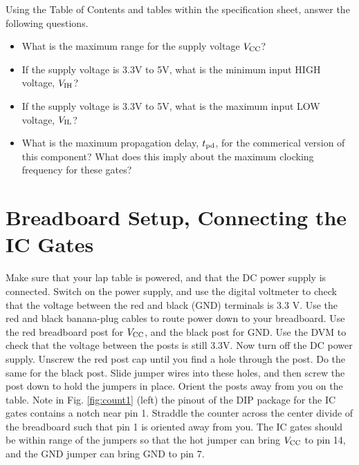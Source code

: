 \documentclass{article}
\begin{document}
\noindent
Using the Table of Contents and tables within the specification sheet, answer the following questions.
\begin{itemize}
\item What is the maximum range for the supply voltage $V_{\rm CC}$? \vspace{0.25cm}
\item If the supply voltage is 3.3V to 5V, what is the minimum input HIGH voltage, $V_{\rm IH}$? \vspace{0.25cm}
\item If the supply voltage is 3.3V to 5V, what is the maximum input LOW voltage, $V_{\rm IL}$? \vspace{0.25cm}
\item What is the maximum propagation delay, $t_{\rm pd}$, for the commerical version of this component?  What does this imply about the maximum clocking frequency for these gates?  \vspace{0.25cm}
\end{itemize}

\section{Breadboard Setup, Connecting the IC Gates}

Make sure that your lap table is powered, and that the DC power supply is connected.  Switch on the power supply, and use the digital voltmeter to check that the voltage between the red and black (GND) terminals is 3.3 V.  Use the red and black banana-plug cables to route power down to your breadboard.  Use the red breadboard post for $V_{\rm CC}$, and the black post for GND.  Use the DVM to check that the voltage between the posts is still 3.3V.  Now turn off the DC power supply.  Unscrew the red post cap until you find a hole through the post.  Do the same for the black post.  Slide jumper wires into these holes, and then screw the post down to hold the jumpers in place.  Orient the posts away from you on the table.  Note in Fig. \ref{fig:count1} (left) the pinout of the DIP package for the IC gates contains a notch near pin 1.  Straddle the counter across the center divide of the breadboard such that pin 1 is oriented away from you.  The IC gates should be within range of the jumpers so that the hot jumper can bring $V_{\rm CC}$ to pin 14, and the GND jumper can bring GND to pin 7.
\end{document}
